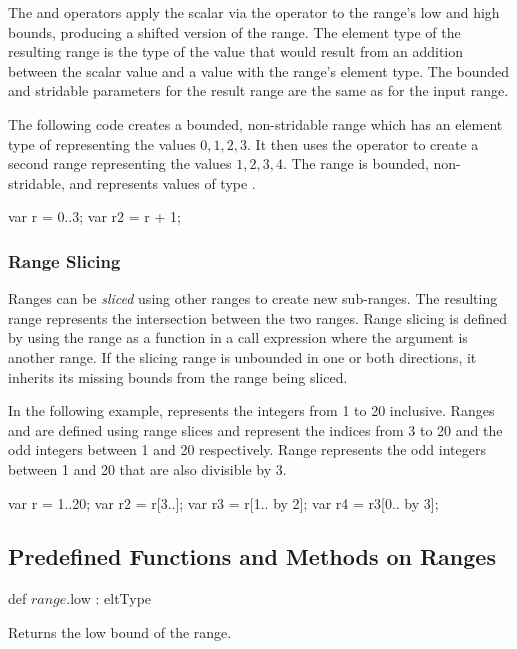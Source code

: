 The \chpl{+} and \chpl{-} operators apply the scalar via the operator
to the range's low and high bounds, producing a shifted version of the
range.  The element type of the resulting range is the type of the value
that would result from an addition between the scalar value and a value
with the range's element type.  The bounded and stridable parameters for
the result range are the same as for the input range.

\begin{example}
The following code creates a bounded, non-stridable range 
which has an element type of  representing the values ${0,
  1, 2, 3}$.  It then uses the \chpl{+} operator to
create a second range  representing the values ${1, 2, 3,
  4}$.  The  range is bounded, non-stridable, and represents
values of type .
\begin{chapel}
var r = 0..3;
var r2 = r + 1;
\end{chapel}
\end{example}


\subsubsection{Range Slicing}
\label{Range_Slicing}

Ranges can be \emph{sliced} using other ranges to create new
sub-ranges.  The resulting range represents the intersection between
the two ranges.  Range slicing is defined by using the range as a
function in a call expression where the argument is another range.
If the slicing range is unbounded in one or both directions, it
inherits its missing bounds from the range being sliced.

\begin{example}
In the following example,  represents the integers from 1 to
20 inclusive.  Ranges  and  are defined using range
slices and represent the indices from 3 to 20 and the odd integers
between 1 and 20 respectively. Range  represents the odd
integers between 1 and 20 that are also divisible by 3.
\begin{chapel}
var r = 1..20;
var r2 = r[3..];
var r3 = r[1.. by 2];
var r4 = r3[0.. by 3];
\end{chapel}
\end{example}

\subsection{Predefined Functions and Methods on Ranges}
\begin{protohead}
def $range$.low : eltType
\end{protohead}
\begin{protobody}
Returns the low bound of the range.
\end{protobody}

